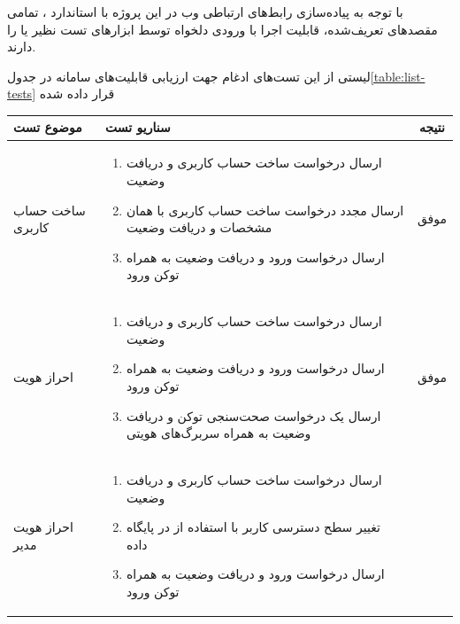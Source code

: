 با توجه به پیاده‌سازی رابط‌های ارتباطی وب در این پروژه با استاندارد ، تمامی مقصد‌های تعریف‌شده، قابلیت اجرا با ورودی دلخواه توسط ابزار‌های تست  نظیر  یا  را دارند.


لیستی از این تست‌های ادغام جهت ارزیابی قابلیت‌های سامانه در جدول\ref{table:list-tests} قرار داده شده

\begin{center}
	\begin{longtable}{ | P{2cm} | P{11cm} | c | } 
		\hline
		موضوع تست & سناریو تست & نتیجه \\ [1 cm] 
		\hline
		\hline
		ساخت حساب کاربری &
		{\footnotesize
		\begin{enumerate}[rightmargin=1cm,topsep=0pt,partopsep=0pt]
			\item ارسال درخواست ساخت حساب کاربری و دریافت وضعیت 
			\item ارسال مجدد درخواست ساخت حساب کاربری با همان مشخصات و دریافت وضعیت 
			\item ارسال درخواست ورود و دریافت وضعیت  به همراه توکن ورود
		\end{enumerate} 
	} &
		موفق \\
		\hline
		
		احراز هویت &
{\footnotesize
\begin{enumerate}[rightmargin=1cm,topsep=0pt,partopsep=0pt]
	\item ارسال درخواست ساخت حساب کاربری و دریافت وضعیت 
	
	\item ارسال درخواست ورود و دریافت وضعیت  به همراه توکن ورود
	
	\item ارسال یک درخواست صحت‌سنجی توکن و دریافت وضعیت  به همراه سربرگ‌های هویتی
\end{enumerate}
} &
موفق \\ \hline
		
		
		احراز هویت مدیر &
		{\footnotesize
		\begin{enumerate}[rightmargin=1cm,topsep=0pt,partopsep=0pt]
			\item ارسال درخواست ساخت حساب کاربری و دریافت وضعیت 
			
			\item تغییر سطح دسترسی کاربر با استفاده‌ از  در پایگاه داده
			
			\item ارسال درخواست ورود و دریافت وضعیت  به همراه توکن ورود
			

\end{enumerate}}
\end{longtable}
\end{center}
